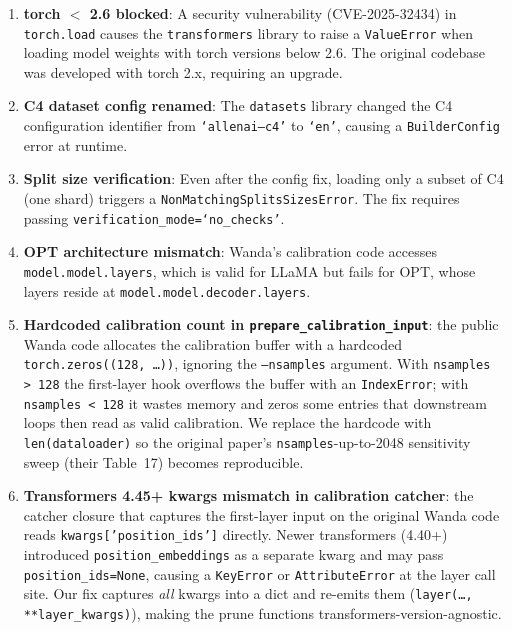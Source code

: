 \documentclass{article}
\begin{document}
\begin{enumerate}
  \item \textbf{torch $<$ 2.6 blocked}: A security vulnerability
        (CVE-2025-32434) in \texttt{torch.load} causes the \texttt{transformers}
        library to raise a \texttt{ValueError} when loading model weights with
        torch versions below 2.6. The original codebase was developed with
        torch 2.x, requiring an upgrade.

  \item \textbf{C4 dataset config renamed}: The \texttt{datasets} library
        changed the C4 configuration identifier from \texttt{`allenai--c4'}
        to \texttt{`en'}, causing a \texttt{BuilderConfig} error at runtime.

  \item \textbf{Split size verification}: Even after the config fix,
        loading only a subset of C4 (one shard) triggers a
        \texttt{NonMatchingSplitsSizesError}. The fix requires passing
        \texttt{verification\_mode=`no\_checks'}.

  \item \textbf{OPT architecture mismatch}: Wanda's calibration code
        accesses \texttt{model.model.layers}, which is valid for LLaMA
        but fails for OPT, whose layers reside at
        \texttt{model.model.decoder.layers}.

  \item \textbf{Hardcoded calibration count in \texttt{prepare\_calibration\_input}}:
        the public Wanda code allocates the calibration buffer with a
        hardcoded \texttt{torch.zeros((128, \ldots))}, ignoring the
        \texttt{--nsamples} argument. With \texttt{nsamples > 128} the
        first-layer hook overflows the buffer with an \texttt{IndexError};
        with \texttt{nsamples < 128} it wastes memory and zeros some
        entries that downstream loops then read as valid calibration.
        We replace the hardcode with \texttt{len(dataloader)} so the
        original paper's \texttt{nsamples}-up-to-2048 sensitivity sweep
        (their Table~17) becomes reproducible.

  \item \textbf{Transformers 4.45+ kwargs mismatch in calibration catcher}:
        the catcher closure that captures the first-layer input on the
        original Wanda code reads \texttt{kwargs['position\_ids']}
        directly. Newer transformers (4.40+) introduced
        \texttt{position\_embeddings} as a separate kwarg and may pass
        \texttt{position\_ids=None}, causing a \texttt{KeyError} or
        \texttt{AttributeError} at the layer call site. Our fix captures
        \emph{all} kwargs into a dict and re-emits them
        (\texttt{layer(\ldots, **layer\_kwargs)}), making the prune
        functions transformers-version-agnostic.


\end{enumerate}
\end{document}
